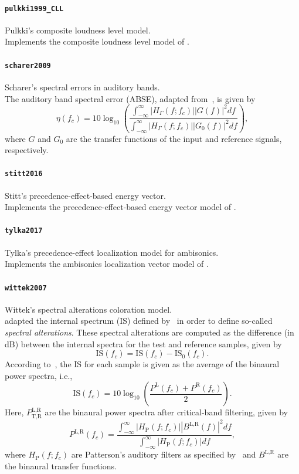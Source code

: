 \documentclass[11pt, oneside]{article}
\newcommand{\function}[1]{\paragraph*{\texttt{#1}}}
\begin{document}
\function{pulkki1999\_CLL} Pulkki's composite loudness level model. \\
Implements the composite loudness level model of \citet{Pulkki1999}.

\function{scharer2009} Scharer's spectral errors in auditory bands. \\
The auditory band spectral error (ABSE), adapted from~\citet[Eq.~(9)]{ScharerLindau2009}, is given by
\begin{equation}\label{eq:scharer2009}
\eta(f_c) = 10 \log_{10} \left( \frac{\displaystyle \int_{-\infty}^\infty |H_\Gamma(f;f_c)| |G(f)|^2 df}{\displaystyle \int_{-\infty}^\infty |H_\Gamma(f;f_c)| |G_0(f)|^2 df} \right),
\end{equation}
where $G$ and $G_0$ are the transfer functions of the input and reference signals, respectively.

\function{stitt2016} Stitt's precedence-effect-based energy vector. \\
Implements the precedence-effect-based energy vector model of \citet{Stitt2016}.

\function{tylka2017} Tylka's precedence-effect localization model for ambisonics. \\
Implements the ambisonics localization vector model of \citet{TylkaChoueiri2017a}.

\function{wittek2007} Wittek's spectral alterations coloration model. \\
\citet{Wittek2007} adapted the internal spectrum (IS) defined by~\citet[chapter~5]{Salomons1995PhD} in order to define so-called \textit{spectral alterations}.
These spectral alterations are computed as the difference (in dB) between the internal spectra for the test and reference samples, given by
\begin{equation}
\text{IS}(f_c) = \text{IS}(f_c) - \text{IS}_0(f_c).
\end{equation}
According to~\citet[section~3.2.5]{Wittek2007}, the IS for each sample is given as the average of the binaural power spectra, i.e.,
\begin{equation}
\text{IS}(f_c) = 10 \log_{10} \left( \frac{P^\text{L}(f_c) + P^\text{R}(f_c)}{2} \right).
\end{equation}
Here, $P_{\text{T},\text{R}}^{\text{L},\text{R}}$ are the binaural power spectra after critical-band filtering, given by~\citep[Eq.~(5.12)]{Salomons1995PhD}
\begin{equation}
P^{\text{L},\text{R}}(f_c) = \frac{\displaystyle \int_{-\infty}^\infty |H_\text{P}(f;f_c)| |B^{\text{L},\text{R}}(f)|^2 df}{\displaystyle \int_{-\infty}^\infty |H_\text{P}(f;f_c)| df},
\end{equation}
where $H_\text{P}(f;f_c)$ are Patterson's auditory filters as specified by~\citet[Eq.~(5.9)]{Salomons1995PhD}
and $B^{\text{L},\text{R}}$ are the binaural transfer functions.
\end{document}
